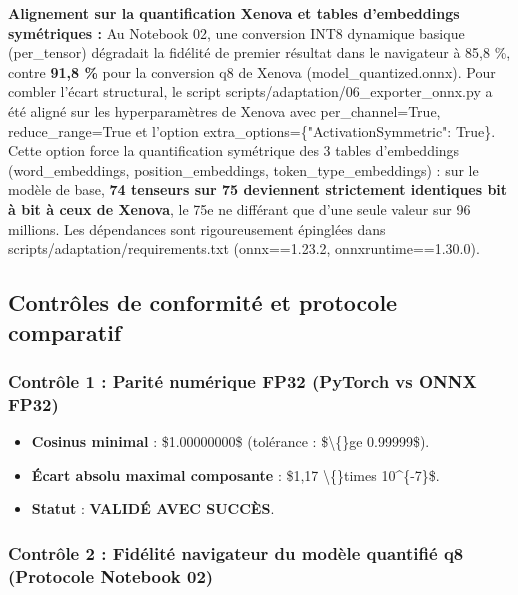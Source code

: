 \documentclass[11pt,a4paper]{article}
\newcommand{\code}[1]  {{\ttfamily #1}}
\begin{document}
\begin{callout}
\textbf{Alignement sur la quantification Xenova et tables d'embeddings symétriques :}   Au Notebook 02, une conversion INT8 dynamique basique (\code{per\_\allowbreak{}tensor}) dégradait la fidélité de premier résultat dans le navigateur à 85,8 \%, contre \textbf{91,8 \%} pour la conversion \code{q8} de Xenova (\code{model\_\allowbreak{}quantized.\allowbreak{}onnx}).   Pour combler l'écart structural, le script \code{scripts/\allowbreak{}adaptation/\allowbreak{}06\_\allowbreak{}exporter\_\allowbreak{}onnx.\allowbreak{}py} a été aligné sur les hyperparamètres de Xenova avec \code{per\_\allowbreak{}channel=True}, \code{reduce\_\allowbreak{}range=True} et l'option \code{extra\_\allowbreak{}options=\{"ActivationSymmetric":\allowbreak{} True\}}. Cette option force la quantification symétrique des 3 tables d'embeddings (\code{word\_\allowbreak{}embeddings}, \code{position\_\allowbreak{}embeddings}, \code{token\_\allowbreak{}type\_\allowbreak{}embeddings}) : sur le modèle de base, \textbf{74 tenseurs sur 75 deviennent strictement identiques bit à bit à ceux de Xenova}, le 75e ne différant que d'une seule valeur sur 96 millions. Les dépendances sont rigoureusement épinglées dans \code{scripts/\allowbreak{}adaptation/\allowbreak{}requirements.\allowbreak{}txt} (\code{onnx==1.\allowbreak{}23.\allowbreak{}2}, \code{onnxruntime==1.\allowbreak{}30.\allowbreak{}0}).
\end{callout}

\subsection{Contrôles de conformité et protocole comparatif}

\subsubsection*{Contrôle 1 : Parité numérique FP32 (PyTorch vs ONNX FP32)}
\begin{itemize}
\item \textbf{Cosinus minimal} : \$1.00000000\$ (tolérance : \$\textbackslash\{\}ge 0.99999\$).
\item \textbf{Écart absolu maximal composante} : \$1,17 \textbackslash\{\}times 10\textasciicircum{}\{-7\}\$.
\item \textbf{Statut} : \textbf{VALIDÉ AVEC SUCCÈS}.
\end{itemize}

\subsubsection*{Contrôle 2 : Fidélité navigateur du modèle quantifié q8 (Protocole Notebook 02)}
\end{document}
